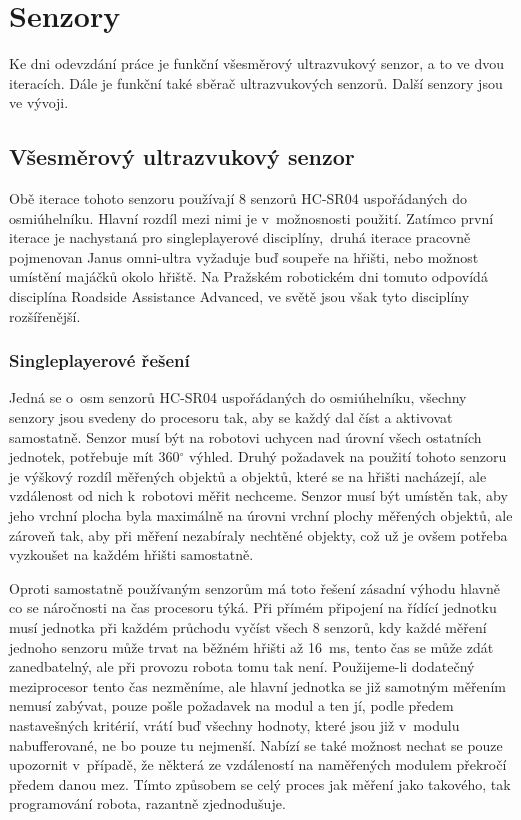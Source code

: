 \chapter{Senzory}
Ke dni odevzdání práce je funkční všesměrový ultrazvukový senzor, a to ve dvou iteracích.
Dále je funkční také sběrač ultrazvukových senzorů.
Další senzory jsou ve vývoji.

\section{Všesměrový ultrazvukový senzor}
Obě iterace tohoto senzoru používají 8 senzorů HC-SR04 uspořádaných do osmiúhelníku.
Hlavní rozdíl mezi nimi je v~možnosnosti použití.
Zatímco první iterace je nachystaná pro singleplayerové disciplíny,~druhá iterace pracovně pojmenovan Janus omni-ultra vyžaduje buď soupeře na hřišti, nebo možnost umístění majáčků okolo hřiště. 
Na Pražském robotickém dni tomuto odpovídá disciplína Roadside Assistance Advanced, ve světě jsou však tyto disciplíny rozšířenější.

\subsection{Singleplayerové řešení}
Jedná se o~osm senzorů HC-SR04 uspořádaných do osmiúhelníku, všechny senzory jsou svedeny do procesoru tak, aby se každý dal číst a aktivovat samostatně.
Senzor musí být na robotovi uchycen nad úrovní všech ostatních jednotek, potřebuje mít 360$^{\circ}$ výhled.
Druhý požadavek na použití tohoto senzoru je výškový rozdíl měřených objektů a objektů, které se na hřišti nacházejí, ale vzdálenost od nich k~robotovi měřit nechceme.
Senzor musí být umístěn tak, aby jeho vrchní plocha byla maximálně na úrovni vrchní plochy měřených objektů, ale zároveň tak, aby při měření nezabíraly nechtěné objekty, což už je ovšem potřeba vyzkoušet na každém hřišti samostatně.

Oproti samostatně používaným senzorům má toto řešení zásadní výhodu hlavně co se náročnosti na čas procesoru týká.
Při přímém připojení na řídící jednotku musí jednotka při každém průchodu vyčíst všech 8 senzorů, kdy každé měření jednoho senzoru může trvat na běžném hřišti až 16~ms, tento čas se může zdát zanedbatelný, ale při provozu robota tomu tak není.
Použijeme-li dodatečný meziprocesor tento čas nezměníme, ale hlavní jednotka se již samotným měřením nemusí zabývat, pouze pošle požadavek na modul a ten jí, podle předem nastavešných kritérií, vrátí buď všechny hodnoty, které jsou již v~modulu nabufferované, ne bo pouze tu nejmenší.
Nabízí se také možnost nechat se pouze upozornit v~případě, že některá ze vzdáleností na naměřených modulem překročí předem danou mez.
Tímto způsobem se celý proces jak měření jako takového, tak programování robota, razantně zjednodušuje.  

